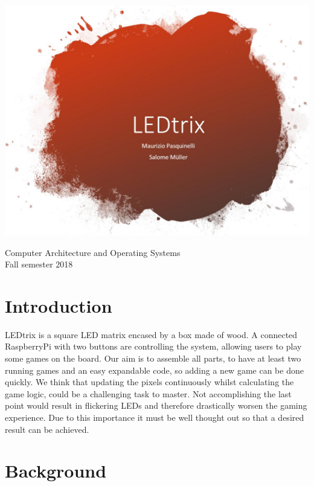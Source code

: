 \documentclass[a4paper,12pt]{article}
\begin{document}
\begin{titlepage}
\centering
\vspace*{5cm}

 \includegraphics[width = 1\textwidth]{LEDtrix_Logo.png}
\vspace{1cm}

\large{Computer Architecture and Operating Systems\\Fall semester 2018}
\end{titlepage}
 
 \section{Introduction}
 
 LEDtrix is a square LED matrix encased by a box made of wood. A connected RaspberryPi with two buttons are controlling the system, allowing users to play some games on the board.
 Our aim is to assemble all parts, to have at least two running games and an easy expandable code, so adding a new game can be done quickly.
 We think that updating the pixels continuously whilst calculating the game logic, could be a challenging task to master.
 Not accomplishing the last point would result in flickering LEDs and therefore drastically worsen the gaming experience.
 Due to this importance it must be well thought out so that a desired result can be achieved.
 
 \section{Background}
 
\end{document}
